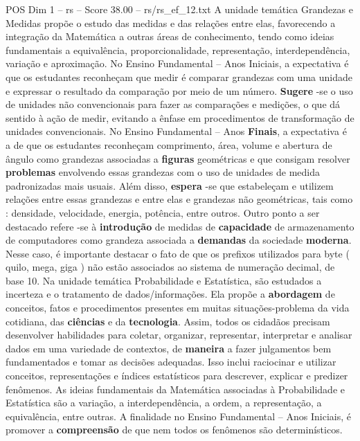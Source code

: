 \begin{textsample}{POS Dim 1 – rs – Score 38.00 – rs/rs\_ef\_12.txt}  \label{ex:f1_pos_210}
A unidade temática Grandezas e Medidas propõe o estudo das medidas e das relações entre elas, favorecendo a integração da Matemática a outras áreas de conhecimento, tendo como ideias fundamentais a equivalência, proporcionalidade, representação, interdependência, variação e aproximação.
No Ensino Fundamental – Anos Iniciais, a expectativa é que os estudantes reconheçam que medir é comparar grandezas com uma unidade e expressar o resultado da comparação por meio de um número. \textbf{Sugere} -se o uso de unidades não convencionais para fazer as comparações e medições, o que dá sentido à ação de medir, evitando a ênfase em procedimentos de transformação de unidades convencionais.
No Ensino Fundamental – Anos \textbf{Finais}, a expectativa é a de que os estudantes reconheçam comprimento, área, volume e abertura de ângulo como grandezas associadas a \textbf{figuras} geométricas e que consigam resolver \textbf{problemas} envolvendo essas grandezas com o uso de unidades de medida padronizadas mais usuais.
Além disso, \textbf{espera} -se que estabeleçam e utilizem relações entre essas grandezas e entre elas e grandezas não geométricas, tais como : densidade, velocidade, energia, potência, entre outros.
Outro ponto a ser destacado refere -se à \textbf{introdução} de medidas de \textbf{capacidade} de armazenamento de computadores como grandeza associada a \textbf{demandas} da sociedade \textbf{moderna}.
Nesse caso, é importante destacar o fato de que os prefixos utilizados para byte ( quilo, mega, giga ) não estão associados ao sistema de numeração decimal, de base 10.
Na unidade temática Probabilidade e Estatística, são estudados a incerteza e o tratamento de dados/informações.
Ela propõe a \textbf{abordagem} de conceitos, fatos e procedimentos presentes em muitas situações-problema da vida cotidiana, das \textbf{ciências} e da \textbf{tecnologia}.
Assim, todos os cidadãos precisam desenvolver habilidades para coletar, organizar, representar, interpretar e analisar dados em uma variedade de contextos, de \textbf{maneira} a fazer julgamentos bem fundamentados e tomar as decisões adequadas.
Isso inclui raciocinar e utilizar conceitos, representações e índices estatísticos para descrever, explicar e predizer fenômenos.
As ideias fundamentais da Matemática associadas à Probabilidade e Estatística são a variação, a interdependência, a ordem, a representação, a equivalência, entre outras.
A finalidade no Ensino Fundamental – Anos Iniciais, é promover a \textbf{compreensão} de que nem todos os fenômenos são determinísticos.

\end{textsample}
